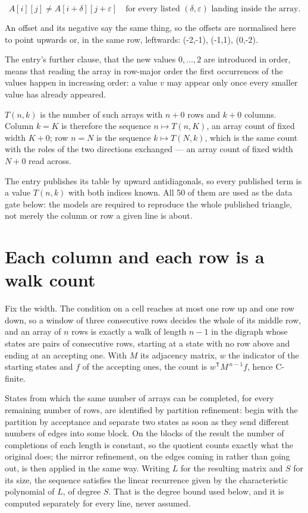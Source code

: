 \documentclass[11pt]{article}
\theoremstyle{definition}
\begin{document}
\[A[i][j] \ne A[i{+}\delta][j{+}\varepsilon]\quad\text{for every listed }(\delta,\varepsilon)\text{ landing inside the array.}\]

An offset and its negative say the same thing, so the offsets are normalised here to point upwards or, in the same row, leftwards: (-2,-1), (-1,1), (0,-2).

The entry's further clause, that the new values $0,\dots,2$ are introduced in order, means that reading the array in row-major order the first occurrences of the values happen in increasing order: a value $v$ may appear only once every smaller value has already appeared.

$T(n,k)$ is the number of such arrays with $n + 0$ rows and $k + 0$ columns. Column $k = K$ is therefore the sequence $n \mapsto T(n,K)$, an array count of fixed width $K + 0$; row $n = N$ is the sequence $k \mapsto T(N,k)$, which is the same count with the roles of the two directions exchanged --- an array count of fixed width $N + 0$ read across.

The entry publishes its table by upward antidiagonals, so every published term is a value $T(n,k)$ with both indices known. All 50 of them are used as the data gate below: the models are required to reproduce the whole published triangle, not merely the column or row a given line is about.

\section{Each column and each row is a walk count}

Fix the width. The condition on a cell reaches at most one row up and one row down, so a window of three consecutive rows decides the whole of its middle row, and an array of $n$ rows is exactly a walk of length $n-1$ in the digraph whose states are pairs of consecutive rows, starting at a state with no row above and ending at an accepting one. With $M$ its adjacency matrix, $w$ the indicator of the starting states and $f$ of the accepting ones, the count is $w^{\mathsf T}M^{\,n-1}f$, hence C-finite.

States from which the same number of arrays can be completed, for every remaining number of rows, are identified by partition refinement: begin with the partition by acceptance and separate two states as soon as they send different numbers of edges into some block. On the blocks of the result the number of completions of each length is constant, so the quotient counts exactly what the original does; the mirror refinement, on the edges coming in rather than going out, is then applied in the same way. Writing $L$ for the resulting matrix and $S$ for its size, the sequence satisfies the linear recurrence given by the characteristic polynomial of $L$, of degree $S$. That is the degree bound used below, and it is computed separately for every line, never assumed.
\end{document}
